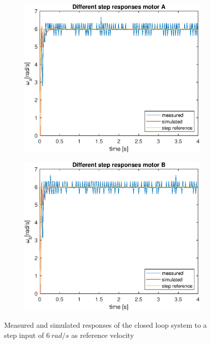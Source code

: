 \documentclass[a4paper,kul]{kulakarticle} %
\begin{document}
\begin{figure}[htp!]
	\centering
	\begin{subfigure}[b]{0.49\textwidth}
		\centering
		\includegraphics[width=\linewidth]{comparison_stepresponseA.eps}
		
	\end{subfigure}
	\hfill
	\begin{subfigure}[b]{0.49\textwidth}  
		\centering
		\includegraphics[width=\linewidth]{comparison_stepresponseB.eps}
		
	\end{subfigure}
	\caption{Measured and simulated responses of the closed loop system to a step input of $\SI{6}{rad/s}$ as reference velocity}
	\label{fig:comparisonstepresponse}
\end{figure}
\end{document}

